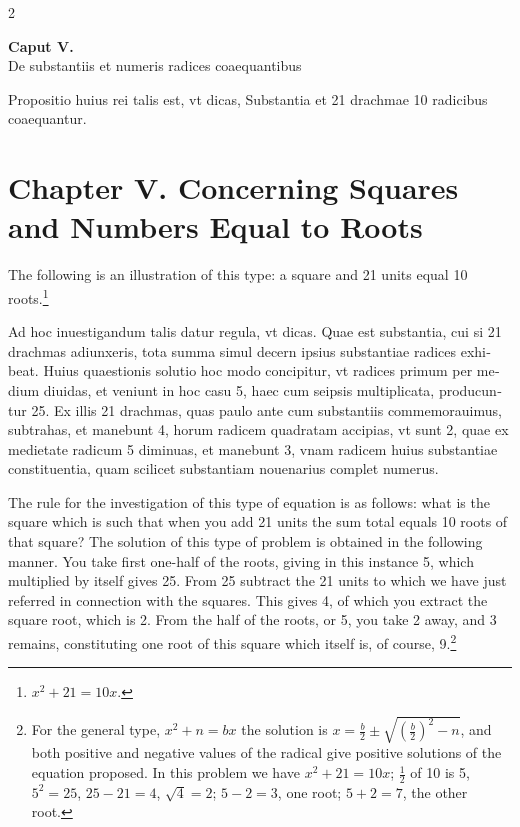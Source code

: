\documentclass[11pt,a4paper,twoside]{book}
\newcommand{\latincolumn}[1]{\textlatin{\small #1}}
\begin{document}
\begin{paracol}{2}
\switchcolumn

\switchcolumn*

\begin{center}
{\normalsize\bfseries\color{sectioncolor} Caput V.}\\[0.2cm]
\latincolumn{De substantiis et numeris radices coaequantibus}
\end{center}

\medskip

\latincolumn{Propositio huius rei talis est, vt dicas, Substantia et 21 drachmae 10 radicibus coaequantur.}

\switchcolumn

\section*{Chapter V. Concerning Squares and Numbers Equal to Roots}

The following is an illustration of this type: a square and 21 units equal 10 roots.\footnote{$x^2 + 21 = 10x$.}

\switchcolumn*

\latincolumn{Ad hoc inuestigandum talis datur regula, vt dicas. Quae est substantia, cui si 21 drachmas adiunxeris, tota summa simul decern ipsius substantiae radices exhibeat. Huius quaestionis solutio hoc modo concipitur, vt radices primum per medium diuidas, et veniunt in hoc casu 5, haec cum seipsis multiplicata, producuntur 25. Ex illis 21 drachmas, quas paulo ante cum substantiis commemorauimus, subtrahas, et manebunt 4, horum radicem quadratam accipias, vt sunt 2, quae ex medietate radicum 5 diminuas, et manebunt 3, vnam radicem huius substantiae constituentia, quam scilicet substantiam nouenarius complet numerus.}

\switchcolumn

The rule for the investigation of this type of equation is as follows: what is the square which is such that when you add 21 units the sum total equals 10 roots of that square? The solution of this type of problem is obtained in the following manner. You take first one-half of the roots, giving in this instance 5, which multiplied by itself gives 25. From 25 subtract the 21 units to which we have just referred in connection with the squares. This gives 4, of which you extract the square root, which is 2. From the half of the roots, or 5, you take 2 away, and 3 remains, constituting one root of this square which itself is, of course, 9.\footnote{For the general type, $x^2 + n = bx$ the solution is $x = \frac{b}{2} \pm \sqrt{(\frac{b}{2})^2 - n}$, and both positive and negative values of the radical give positive solutions of the equation proposed. In this problem we have $x^2 + 21 = 10x$; $\frac{1}{2}$ of 10 is 5, $5^2 = 25$, $25 - 21 = 4$, $\sqrt{4} = 2$; $5 - 2 = 3$, one root; $5 + 2 = 7$, the other root.}


\end{paracol}
\end{document}
